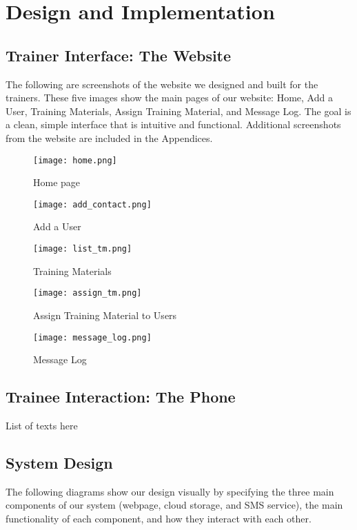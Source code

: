 \chapter{Design and Implementation}

\section{Trainer Interface: The Website}
The following are screenshots of the website we designed and built for the trainers. These five images show the main pages of our website: Home, Add a User, Training Materials, Assign Training Material, and Message Log. The goal is a clean, simple interface that is intuitive and functional. Additional screenshots from the website are included in the Appendices.

\begin{figure}[H]
	\centering
	\texttt{[image: home.png]}
	\caption{Home page}
\end{figure}

\begin{figure}[H]
	\centering
	\texttt{[image: add\_contact.png]}
	\caption{Add a User}
\end{figure}

\begin{figure}[H]
	\centering
	\texttt{[image: list\_tm.png]}
	\caption{Training Materials}
\end{figure}

\begin{figure}[H]
	\centering
	\texttt{[image: assign\_tm.png]}
	\caption{Assign Training Material to Users}
\end{figure}

\begin{figure}[H]
	\centering
	\texttt{[image: message\_log.png]}
	\caption{Message Log}
\end{figure}


\section{Trainee Interaction: The Phone}
List of texts here

\section{System Design}
The following diagrams show our design visually by specifying the three main components of our system (webpage, cloud storage, and SMS service), the main functionality of each component, and how they interact with each other.

